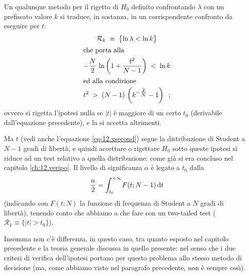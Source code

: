 Un qualunque metodo per il rigetto di $H_0$ definito
confrontando $\lambda$ con un prefissato valore $k$ si
traduce, in sostanza, in un corrispondente confronto da
eseguire per $t$:
\begin{gather*}
  \mathcal{R}_k \; \equiv \; \bigl\{ \ln \lambda < \ln k
    \bigr\} \\
  \intertext{che porta alla}
  - \frac{N}{2} \, \ln \left( 1 + \frac{t^2}{N - 1}
    \right) \; < \; \ln k \\
  \intertext{ed alla condizione}
  t^2 \; > \; (N - 1) \, \left( k^{- \tfrac{2}{N}} - 1
    \right) \;\; ;
\end{gather*}
ovvero si rigetta l'ipotesi nulla se $|t|$ \`e maggiore di
un certo $t_0$ (derivabile dall'equazione precedente), e la
si accetta altrimenti.

Ma $t$ (vedi anche l'equazione \eqref{eq:12.xsecond}) segue
la distribuzione di Student a $N-1$ gradi di libert\`a, e
quindi accettare o rigettare $H_0$ sotto queste ipotesi si
riduce ad un test relativo a quella distribuzione: come
gi\`a si era concluso nel capitolo \ref{ch:12.veripo}.
Il livello di significanza $\alpha$ \`e legato a $t_0$ dalla
\begin{equation*}
  \frac{\alpha}{2} = \int_{t_0}^{+\infty} \! F(t; N-1)
    \, \mathrm{d} t
\end{equation*}
(indicando con $F(t;N)$ la funzione di frequenza di Student
a $N$ gradi di libert\`a), tenendo conto che abbiamo a che
fare con un two-tailed test ($\mathcal{R}_k \equiv \bigl\{
|t| > t_0 \bigr\}$).

Insomma non c'\`e differenza, in questo caso, tra quanto
esposto nel capitolo precedente e la teoria generale
discussa in quello presente: nel senso che i due criteri di
verifica dell'ipotesi portano per questo problema allo
stesso metodo di decisione (ma, come abbiamo visto nel
paragrafo precedente, non \`e sempre cos\`\i).%

\endinput
